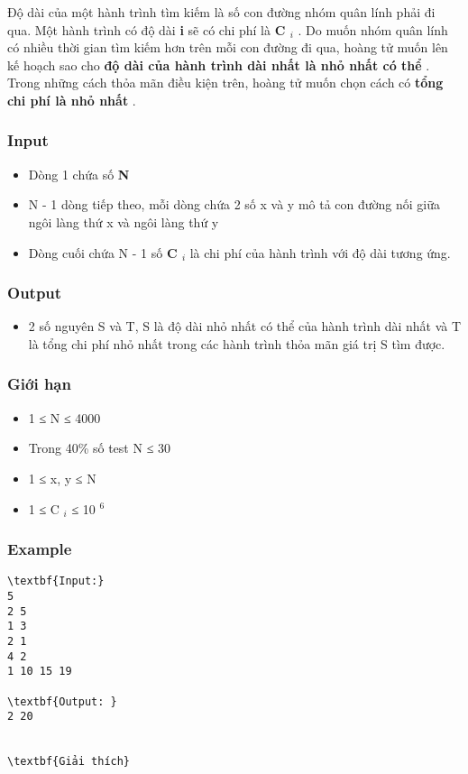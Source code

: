 Độ dài của một hành trình tìm kiếm là số con đường nhóm quân lính phải đi qua. Một hành trình có độ dài \textbf{ i } sẽ có chi phí là \textbf{ C $_ i $} . Do muốn nhóm quân lính có nhiều thời gian tìm kiếm hơn trên mỗi con đường đi qua, hoàng tử muốn lên kế hoạch sao cho \textbf{ độ dài của hành trình dài nhất là nhỏ nhất có thể } . Trong những cách thỏa mãn điều kiện trên, hoàng tử muốn chọn cách có \textbf{ tổng chi phí là nhỏ nhất } .

\subsubsection{Input}
\begin{itemize}
	\item Dòng 1 chứa số \textbf{ N }
	\item N - 1 dòng tiếp theo, mỗi dòng chứa 2 số x và y mô tả con đường nối giữa ngôi làng thứ x và ngôi làng thứ y
	\item Dòng cuối chứa N - 1 số \textbf{ C $_ i $} là chi phí của hành trình với độ dài tương ứng.
\end{itemize}

\subsubsection{Output}
\begin{itemize}
	\item 2 số nguyên S và T, S là độ dài nhỏ nhất có thể của hành trình dài nhất và T là tổng chi phí nhỏ nhất trong các hành trình thỏa mãn giá trị S tìm được.
\end{itemize}

\subsubsection{Giới hạn}
\begin{itemize}
	\item 1 ≤ N ≤ 4000
	\item Trong 40\% số test N ≤ 30
	\item 1 ≤ x, y ≤ N
	\item 1 ≤ C $_ i $ ≤ 10 $^ 6 $
\end{itemize}
\begin{itemize}
\end{itemize}

\subsubsection{Example}
\begin{verbatim}
\textbf{Input:}
5
2 5
1 3
2 1
4 2
1 10 15 19

\textbf{Output: }
2 20


\textbf{Giải thích}\end{verbatim}

